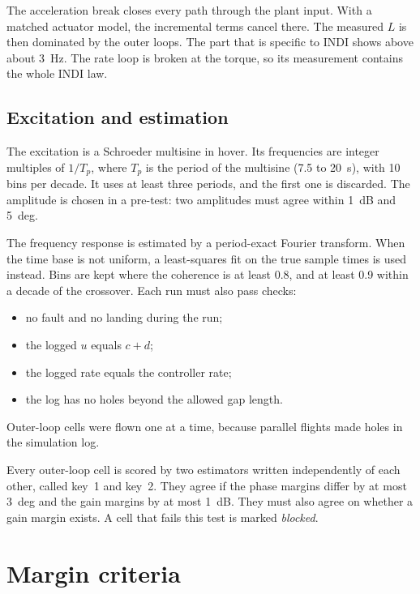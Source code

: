 The acceleration break closes every path through the plant input.
With a matched actuator model, the incremental terms cancel there.
The measured $L$ is then dominated by the outer loops.
The part that is specific to INDI shows above about 3~Hz.
The rate loop is broken at the torque, so its measurement contains the whole INDI law.

\subsection{Excitation and estimation}\label{sec:an_excite}

The excitation is a Schroeder multisine in hover.
Its frequencies are integer multiples of $1/T_p$, where $T_p$ is the period of the multisine (7.5 to 20~s), with 10 bins per decade.
It uses at least three periods, and the first one is discarded.
The amplitude is chosen in a pre-test: two amplitudes must agree within 1~dB and 5~deg.

The frequency response is estimated by a period-exact Fourier transform.
When the time base is not uniform, a least-squares fit on the true sample times is used instead.
Bins are kept where the coherence is at least 0.8, and at least 0.9 within a decade of the crossover.
Each run must also pass checks:
\begin{itemize}
  \item no fault and no landing during the run;
  \item the logged $u$ equals $c+d$;
  \item the logged rate equals the controller rate;
  \item the log has no holes beyond the allowed gap length.
\end{itemize}
Outer-loop cells were flown one at a time, because parallel flights made holes in the simulation log.

Every outer-loop cell is scored by two estimators written independently of each other, called key~1 and key~2.
They agree if the phase margins differ by at most 3~deg and the gain margins by at most 1~dB.
They must also agree on whether a gain margin exists.
A cell that fails this test is marked \emph{blocked}.

\section{Margin criteria}\label{sec:an_criteria}

